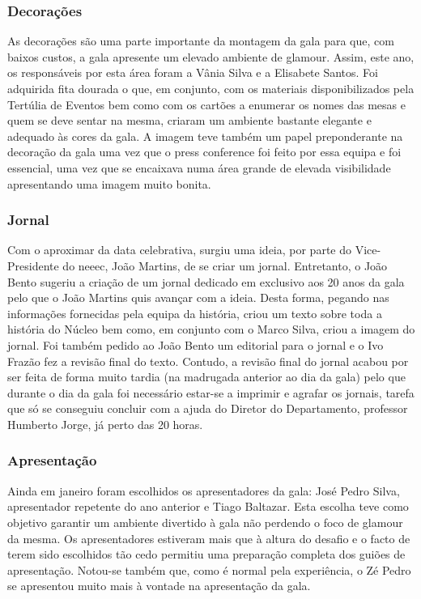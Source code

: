\subsubsection{Decorações}

As decorações são uma parte importante da montagem da gala para que, com baixos custos, a gala apresente um elevado ambiente de glamour. Assim, este ano, os responsáveis por esta área foram a Vânia Silva e a Elisabete Santos. Foi adquirida fita dourada o que, em conjunto, com os materiais disponibilizados pela Tertúlia de Eventos bem como com os cartões a enumerar os nomes das mesas e quem se deve sentar na mesma, criaram um ambiente bastante elegante e adequado às cores da gala. A imagem teve também um papel preponderante na decoração da gala uma vez que o press conference foi feito por essa equipa e foi essencial, uma vez que se encaixava numa área grande de elevada visibilidade apresentando uma imagem muito bonita.

\subsubsection{Jornal}
Com o aproximar da data celebrativa, surgiu uma ideia, por parte do Vice-Presidente do \acrshort{neeec}, João Martins, de se criar um jornal. Entretanto, o João Bento sugeriu a criação de um jornal dedicado em exclusivo aos 20 anos da gala pelo que o João Martins quis avançar com a ideia. Desta forma, pegando nas informações fornecidas pela equipa da história, criou um texto sobre toda a história do Núcleo bem como, em conjunto com o Marco Silva, criou a imagem do jornal. Foi também pedido ao João Bento um editorial para o jornal e o Ivo Frazão fez a revisão final do texto. Contudo, a revisão final do jornal acabou por ser feita de forma muito tardia (na madrugada anterior ao dia da gala) pelo que durante o dia da gala foi necessário estar-se a imprimir e agrafar os jornais, tarefa que só se conseguiu concluir com a ajuda do Diretor do Departamento, professor Humberto Jorge, já perto das 20 horas.

\subsubsection{Apresentação}
Ainda em janeiro foram escolhidos os apresentadores da gala: José Pedro Silva, apresentador repetente do ano anterior e Tiago Baltazar. Esta escolha teve como objetivo garantir um ambiente divertido à gala não perdendo o foco de glamour da mesma. Os apresentadores estiveram mais que à altura do desafio e o facto de terem sido escolhidos tão cedo permitiu uma preparação completa dos guiões de apresentação. Notou-se também que, como é normal pela experiência, o Zé Pedro se apresentou muito mais à vontade na apresentação da gala.

